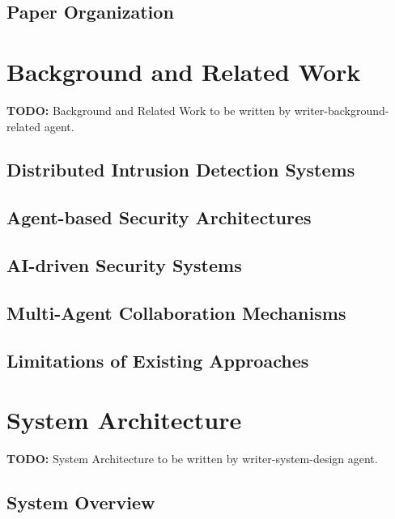 \documentclass[10pt,journal,compsoc]{IEEEtran}
\begin{document}
\subsection{Paper Organization}
\label{subsec:organization}

\section{Background and Related Work}
\label{sec:related-work}
\textbf{TODO:} Background and Related Work to be written by writer-background-related agent.

\subsection{Distributed Intrusion Detection Systems}
\label{subsec:distributed-ids}

\subsection{Agent-based Security Architectures}
\label{subsec:agent-security}

\subsection{AI-driven Security Systems}
\label{subsec:ai-security}

\subsection{Multi-Agent Collaboration Mechanisms}
\label{subsec:multi-agent}

\subsection{Limitations of Existing Approaches}
\label{subsec:limitations}

\section{System Architecture}
\label{sec:architecture}
\textbf{TODO:} System Architecture to be written by writer-system-design agent.

\subsection{System Overview}
\label{subsec:overview}
\end{document}
